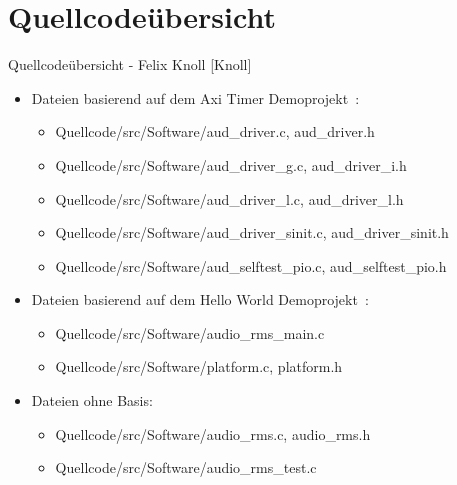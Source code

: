 \section{Quellcodeübersicht}
\begin{frame}{Quellcodeübersicht - Felix Knoll [Knoll]}
    \begin{itemize}
        \item Dateien basierend auf dem Axi Timer Demoprojekt~\cite{at_demoprojekt}:
        \begin{itemize}
            \item Quellcode/src/Software/aud\_driver.c, aud\_driver.h
            \item Quellcode/src/Software/aud\_driver\_g.c, aud\_driver\_i.h
            \item Quellcode/src/Software/aud\_driver\_l.c, aud\_driver\_l.h
            \item Quellcode/src/Software/aud\_driver\_sinit.c, aud\_driver\_sinit.h
            \item Quellcode/src/Software/aud\_selftest\_pio.c, aud\_selftest\_pio.h
        \end{itemize}
        \item Dateien basierend auf dem Hello World Demoprojekt~\cite{hello_demoprojekt}:
        \begin{itemize}
            \item Quellcode/src/Software/audio\_rms\_main.c
            \item Quellcode/src/Software/platform.c, platform.h
        \end{itemize}
        \item Dateien ohne Basis:
        \begin{itemize}
            \item Quellcode/src/Software/audio\_rms.c, audio\_rms.h
            \item Quellcode/src/Software/audio\_rms\_test.c
        \end{itemize}
    \end{itemize}
\end{frame}
